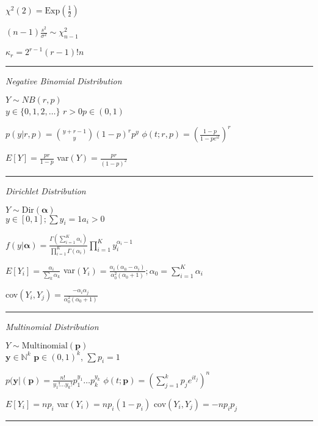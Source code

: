 \documentclass[notitlepage,10pt,twocolumn]{article}
\begin{document}
$ \chi^2(2) = \text{Exp}(\frac{1}{2})$

$(n-1)\frac{s^2}{\sigma^2} \sim \chi^2_{n-1}$

$\kappa_r = 2^{r-1}(r-1)! n$

\vspace{.15cm}\hrule \vspace{.15cm}

\emph{\sffamily Negative Binomial Distribution}

$Y \sim NB(r,p)$\\
	$y\in \{0,1,2,\dots \}$ \quad $r>0$\quad $p\in (0,1)$

$p(y|r,p) = \binom{y+r-1}{y} (1-p)^r p^y$ \quad $\phi(t;r,p) = \left(\frac{1-p}{1-pe^{it}}\right)^r$

$E[Y] = \frac{pr}{1-p}$ \quad var$(Y) = \frac{pr}{(1-p)^2}$

\vspace{.15cm}\hrule \vspace{.15cm}

\emph{\sffamily Dirichlet Distribution}

$Y \sim \text{Dir}(\boldsymbol{\alpha})$\\
	$y \in [0,1]; \sum y_i =1$\quad $a_i >0$

$f(y|\boldsymbol{\alpha}) = \frac{\Gamma(\sum_{i=1}^K \alpha_i)}{\prod_{i=1}^K \Gamma(\alpha_i)} \prod_{i=1}^K y_i^{\alpha_i -1}$

$E[Y_i] = \frac{\alpha_i}{\sum_k \alpha_k}$ \quad var$(Y_i) = \frac{\alpha_i(\alpha_0 - \alpha_i)}{\alpha_0^2 (\alpha_0 +1)}; \alpha_0=\sum_{i=1}^K \alpha_i$

cov$(Y_i,Y_j) = \frac{-\alpha_i \alpha_j}{\alpha_0^2 (\alpha_0+1)} $

\vspace{.15cm}\hrule \vspace{.15cm}

\emph{\sffamily Multinomial Distribution}

$Y \sim \text{Multinomial}(\boldsymbol{p})$\\
	$\boldsymbol{y} \in \mathbb{N}^k$ \quad $\boldsymbol{p} \in (0,1)^k$, $\sum p_i =1$

$p(\boldsymbol{y}|(\boldsymbol{p}) = \frac{n!}{y_1! \dots y_k!}p_1^{y_1} \dots p_k^{y_k}$ \quad $\phi(t;\boldsymbol{p})=\left( \sum_{j=1}^k p_j e^{it_j} \right)^n$

$E[Y_i] = np_i$ \quad var$(Y_i) = np_i(1-p_i)$ \quad cov$(Y_i,Y_j) = -np_ip_j$

\vspace{.15cm}\hrule \vspace{.15cm}
\end{document}
